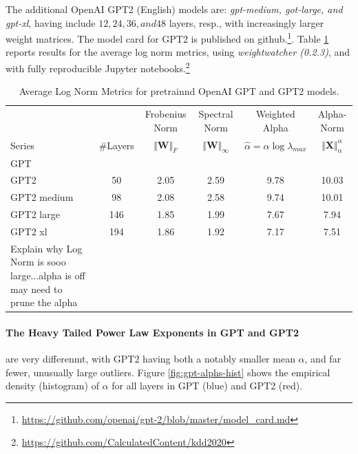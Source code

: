 The additional OpenAI GPT2 (English) models are: \emph{gpt-medium, got-large, and gpt-xl}, 
having include $12, 24, 36, and 48$ layers, resp., with increasingly larger weight matrices.
The model card for GPT2 is published on github.\footnote{\url{https://github.com/openai/gpt-2/blob/master/model_card.md}}.
Table \ref{table:nlp} reports results for the average log norm metrics, using \emph{weightwatcher (0.2.3)},
and with fully reproducible Jupyter notebooks.\footnote{\url{https://github.com/CalculatedContent/kdd2020}}


\begin{table}[t]
\small
\begin{center}
\begin{tabular}{|p{1in}|c|c|c|c|c|}
\hline
   &    & Frobenius Norm & Spectral Norm & Weighted Alpha & Alpha-Norm \\
 Series & \#Layers   & $\Vert\mathbf{W}\Vert_{F}$ & $\Vert\mathbf{W}\Vert_{\infty}$ & $\hat{\alpha}=\alpha\log\lambda_{max}$ & $\Vert\mathbf{X}\Vert^{\alpha}_{\alpha}$ \\
\hline
 GPT & & & & &\\
GPT2 & 50 & 2.05 &2.59& 9.78 & 10.03 \\
GPT2 medium & 98 & 2.08 &2.58& 9.74 & 10.01 \\
GPT2 large & 146 & 1.85 &1.99& 7.67 & 7.94 \\
GPT2 xl & 194 & 1.86 &1.92& 7.17 & 7.51 \\

Explain why Log Norm is sooo large...alpha is off may need to prune the alpha

\end{tabular}
\end{center}
\caption{Average Log Norm Metrics for pretrainnd OpenAI GPT and GPT2 models.}
\label{table:nlp}
\end{table}


\paragraph{The Heavy Tailed Power Law Exponents in GPT and GPT2}

are very differenmt, with GPT2 having both a notably smaller mean $\alpha$, and far fewer, unusually large outliers.
Figure \ref{fig:gpt-alphs-hist} shows the empirical density (histogram) of $\alpha$
for all layers in GPT (blue) and GPT2 (red).  

